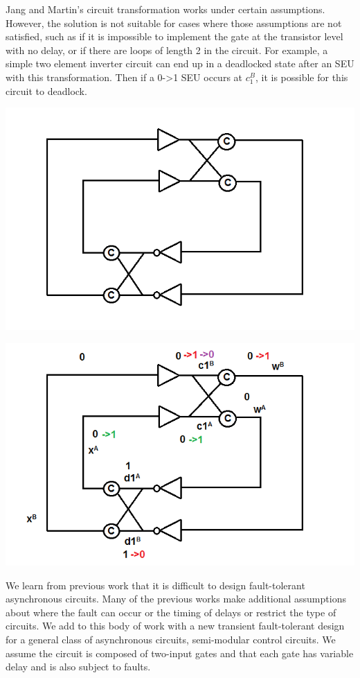 \documentclass[12pt]{report}
\begin{document}
Jang and Martin’s circuit transformation works under certain assumptions. However, the solution is not suitable for cases where those assumptions are not satisfied, such as if it is impossible to implement the gate at the transistor level with no delay, or if there are loops of length 2 in the circuit.  For example, a simple two element inverter circuit can end up in a deadlocked state after an SEU with this transformation. Then if a 0->1 SEU occurs at $c_1^B$, it is possible for this circuit to deadlock.
\begin{center}
\includegraphics[width=.7\textwidth]{transfex}
\end{center}

\begin{center}
\includegraphics[width=.7\textwidth]{transfexc}
\end{center}

We learn from previous work that it is difficult to design fault-tolerant asynchronous circuits.  Many of the previous works make additional assumptions about where the fault can occur or the timing of delays or restrict the type of circuits.  We add to this body of work with a new transient fault-tolerant design for a general class of asynchronous circuits, semi-modular control circuits.  We assume the circuit is composed of two-input gates and that each gate has variable delay and is also subject to faults.  
\end{document}
